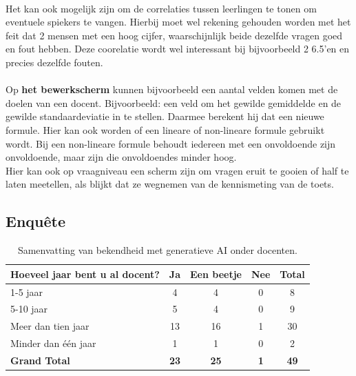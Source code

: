 \documentclass[12pt]{article}
\begin{document}
\begin{multicols}{2}
\\
Het kan ook mogelijk zijn om de correlaties tussen leerlingen te tonen om eventuele spiekers te vangen. Hierbij moet wel rekening gehouden worden met het feit dat 2 mensen met een hoog cijfer, waarschijnlijk beide dezelfde vragen goed en fout hebben. Deze coorelatie wordt wel interessant bij bijvoorbeeld 2 6.5'en en precies dezelfde fouten.\\
\\
Op \textbf{het bewerkscherm} kunnen bijvoorbeeld een aantal velden komen met de doelen van een docent. Bijvoorbeeld: een veld om het gewilde gemiddelde en de gewilde standaardeviatie in te stellen. Daarmee berekent hij dat een nieuwe formule. Hier kan ook worden of een lineare of non-lineare formule gebruikt wordt. Bij een non-lineare formule behoudt iedereen met een onvoldoende zijn onvoldoende, maar zijn die onvoldoendes minder hoog. \\
Hier kan ook op vraagniveau een scherm zijn om vragen eruit te gooien of half te laten meetellen, als blijkt dat ze wegnemen van de kennismeting van de toets.
\end{multicols}

\pagebreak
\subsection{Enquête}

\begin{table}[h!]
\centering

\begin{tabular}{lcccc}
\toprule
\textbf{Hoeveel jaar bent u al docent?} & 
\textbf{Ja} & 
\textbf{Een beetje} & 
\textbf{Nee} & 
\textbf{Total} \\ 
\midrule
1-5 jaar          & 4 & 4 & 0 & 8  \\
5-10 jaar         & 5 & 4 & 0 & 9  \\
Meer dan tien jaar & 13 & 16 & 1 & 30 \\
Minder dan één jaar & 1 & 1 & 0 & 2  \\
\midrule
\textbf{Grand Total} & \textbf{23} & \textbf{25} & \textbf{1} & \textbf{49} \\
\bottomrule
\end{tabular}%


\caption{Samenvatting van bekendheid met generatieve AI onder docenten.}
\label{tab:docenten_technologie}
\end{table}
\end{document}
